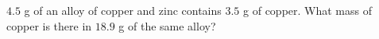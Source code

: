 $4.5$ g of an alloy of copper and zinc contains $3.5$ g of copper. What mass of copper is there in $18.9$ g of the same alloy?
